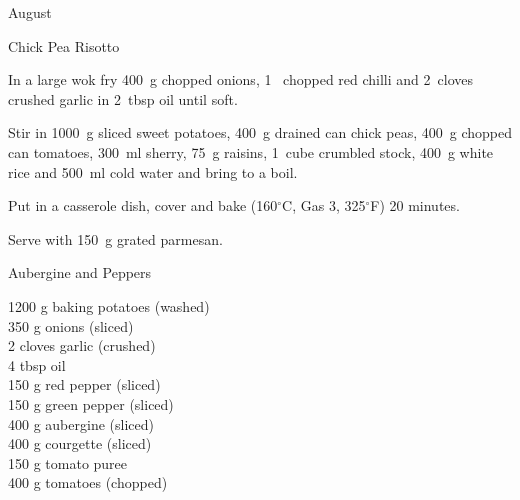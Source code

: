 \begin{menu}{August}
\begin{recipe}{2}{Chick Pea Risotto}
\begin{ingredients}
		\end{ingredients}
	
	
    \begin{instructions}
    \item 
        In a large wok fry
        400~g chopped onions,
        1~ chopped red chilli
        and
        2~cloves crushed garlic
        in
        2~tbsp  oil
        until soft.
      \item 
        Stir in
        1000~g sliced sweet potatoes,
        400~g drained can chick peas,
        400~g chopped can tomatoes,
        300~ml  sherry,
        75~g  raisins,
        1~cube crumbled stock,
        400~g  white rice
        and
        500~ml  cold water
        and bring to a boil.
      \item 
        Put in a
        casserole dish,
        cover and bake (160$^{\circ}$C, Gas 3, 325$^{\circ}$F) 20 minutes.
      \item 
        Serve with
        150~g grated parmesan.
      
    \end{instructions}
    \end{recipe}%
  
    \begin{recipe}{2}{Aubergine and Peppers}%
		\begin{ingredients}
		1200 g baking potatoes (washed) \\
	350 g onions (sliced) \\
	2 cloves garlic (crushed) \\
	4 tbsp oil  \\
	150 g red pepper (sliced) \\
	150 g green pepper (sliced) \\
	400 g aubergine (sliced) \\
	400 g courgette (sliced) \\
	150 g tomato puree  \\
	400 g tomatoes (chopped) \\
	
		\end{ingredients}
	
	

\end{recipe}
\end{menu}
